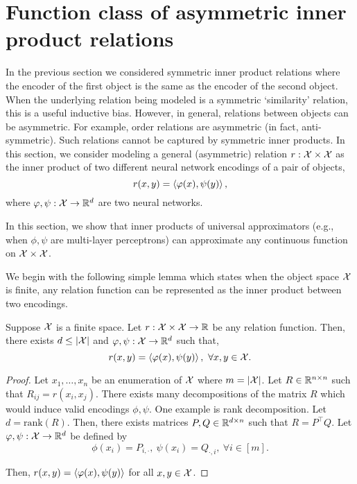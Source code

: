 \section{Function class of asymmetric inner product relations}\label{sec:asymmetric_relations}

In the previous section we considered symmetric inner product relations where the encoder of the first object is the same as the encoder of the second object. When the underlying relation being modeled is a symmetric `similarity' relation, this is a useful inductive bias. However, in general, relations between objects can be asymmetric. For example, order relations are asymmetric (in fact, anti-symmetric). Such relations cannot be captured by symmetric inner products. In this section, we consider modeling a general (asymmetric) relation $r: {\mathcal{X}} \times {\mathcal{X}}$ as the inner product of two different neural network encodings of a pair of objects,
\begin{equation}\label{eq:asymmetric_iprod_relation}
    r(x, y) = \iprod{\phi(x)}{\psi(y)},
\end{equation}
where $\varphi, \psi: {\mathcal{X}} \to \mathbb{R}^d$ are two neural networks.

In this section, we show that inner products of universal approximators (e.g., when $\phi, \psi$ are multi-layer perceptrons) can approximate any continuous function on ${\mathcal{X}} \times {\mathcal{X}}$.

We begin with the following simple lemma which states when the object space ${\mathcal{X}}$ is finite, any relation function can be represented as the inner product between two encodings.

\begin{lemma}\label{lemma:finite_space_rel}
    Suppose ${\mathcal{X}}$ is a finite space. Let $r: {\mathcal{X}} \times {\mathcal{X}} \to \mathbb{R}$ be any relation function. Then, there exists $d \leq \left\lvert{\mathcal{X}}\right\rvert$ and $\varphi, \psi: {\mathcal{X}} \to \mathbb{R}^{d}$ such that,
    \begin{equation*}
        r(x, y) = \iprod{\phi(x)}{\psi(y)}, \ \forall x, y \in \calX.
    \end{equation*}
\end{lemma}

\begin{proof}
    Let $x_1, \ldots, x_n$ be an enumeration of ${\mathcal{X}}$ where $m = \left\lvert{\mathcal{X}}\right\rvert$. Let $R \in \mathbb{R}^{n \times n}$ such that $R_{ij} = r(x_i, x_j)$. There exists many decompositions of the matrix $R$ which would induce valid encodings $\phi, \psi$. One example is rank decomposition. Let $d = \mathrm{rank}(R)$. Then, there exists matrices $P, Q \in \mathbb{R}^{d \times n}$ such that $R = P^\top Q$. Let $\varphi, \psi: {\mathcal{X}} \to \mathbb{R}^{d}$ be defined by
    \begin{equation}
        \phi(x_i) = P_{i, \cdot}, \ \psi(x_i) = Q_{\cdot, i}, \ \forall i \in [m].
    \end{equation}

    Then, $r(x, y) = \left \langle \varphi(x), \psi(y) \right\rangle$ for all $x, y \in {\mathcal{X}}$.
\end{proof}

